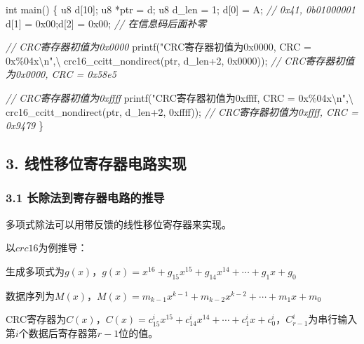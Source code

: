 \documentclass[
]{article}
\newenvironment{Shaded}{}{}
\newcommand{\BaseNTok}[1]{\textcolor[rgb]{0.25,0.63,0.44}{#1}}
\newcommand{\CharTok}[1]{\textcolor[rgb]{0.25,0.44,0.63}{#1}}
\newcommand{\CommentTok}[1]{\textcolor[rgb]{0.38,0.63,0.69}{\textit{#1}}}
\newcommand{\DataTypeTok}[1]{\textcolor[rgb]{0.56,0.13,0.00}{#1}}
\newcommand{\DecValTok}[1]{\textcolor[rgb]{0.25,0.63,0.44}{#1}}
\newcommand{\NormalTok}[1]{#1}
\newcommand{\SpecialCharTok}[1]{\textcolor[rgb]{0.25,0.44,0.63}{#1}}
\newcommand{\StringTok}[1]{\textcolor[rgb]{0.25,0.44,0.63}{#1}}
\begin{document}
\begin{Shaded}
\begin{Highlighting}[]
\DataTypeTok{int}\NormalTok{ main()}
\NormalTok{\{}
\NormalTok{	u8 d[}\DecValTok{10}\NormalTok{];}
\NormalTok{	u8 *ptr = d;}
\NormalTok{	u8 d\_len = }\DecValTok{1}\NormalTok{;}
\NormalTok{	d[}\DecValTok{0}\NormalTok{] = }\CharTok{\textquotesingle{}A\textquotesingle{}}\NormalTok{; }\CommentTok{// 0x41, 0b01000001}
\NormalTok{	d[}\DecValTok{1}\NormalTok{] = }\BaseNTok{0x00}\NormalTok{;d[}\DecValTok{2}\NormalTok{] = }\BaseNTok{0x00}\NormalTok{; }\CommentTok{// 在信息码后面补零}
	
	\CommentTok{// CRC寄存器初值为0x0000}
\NormalTok{	printf(}\StringTok{"CRC寄存器初值为0x0000, CRC = 0x\%04x}\SpecialCharTok{\textbackslash{}n}\StringTok{"}\NormalTok{,\textbackslash{}}
\NormalTok{		crc16\_ccitt\_nondirect(ptr, d\_len+}\DecValTok{2}\NormalTok{, }\BaseNTok{0x0000}\NormalTok{));}
	\CommentTok{// CRC寄存器初值为0x0000, CRC = 0x58e5 }
	
	\CommentTok{// CRC寄存器初值为0xffff}
\NormalTok{	printf(}\StringTok{"CRC寄存器初值为0xffff, CRC = 0x\%04x}\SpecialCharTok{\textbackslash{}n}\StringTok{"}\NormalTok{,\textbackslash{}}
\NormalTok{		crc16\_ccitt\_nondirect(ptr, d\_len+}\DecValTok{2}\NormalTok{, }\BaseNTok{0xffff}\NormalTok{));}
    \CommentTok{// CRC寄存器初值为0xffff, CRC = 0x9479}
\NormalTok{\}}
\end{Highlighting}
\end{Shaded}

\hypertarget{header-n131}{%
\subsection{3. 线性移位寄存器电路实现}\label{header-n131}}

\hypertarget{header-n132}{%
\subsubsection{3.1 长除法到寄存器电路的推导}\label{header-n132}}

多项式除法可以用带反馈的线性移位寄存器来实现。

以$crc16$为例推导：

生成多项式为$g(x)$，$g(x)=x^{16}+g_{15}x^{15}+g_{14}x^{14}+\cdots+g_1x+g_0$

数据序列为$M(x)$，$M(x)=m_{k-1}x^{k-1}+m_{k-2}x^{k-2}+\cdots+m_1x+m_0$

CRC寄存器为$C(x)$，$C(x)=c_{15}^ix^{15}+c_{14}^ix^{14}+\cdots+c_1^ix+c_0^i$，$C_{r-1}^i$为串行输入第$i$个数据后寄存器第$r-1$位的值。
\end{document}
